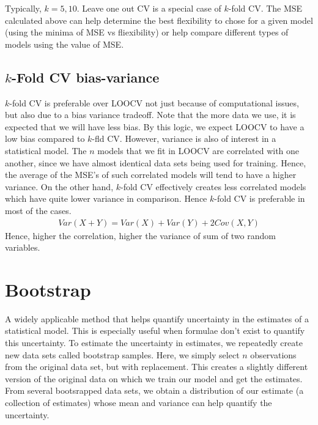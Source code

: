 \documentclass[../statistical_learning_notes.tex]{subfiles}
\begin{document}
    Typically, $k = 5, 10$. Leave one out CV is a special case of $k$-fold CV. The MSE calculated above can help determine the best flexibility to chose for a given model (using the minima of MSE vs fliexibility) or help compare different types of models using the value of MSE. \newline

    \subsection{$k$-Fold CV bias-variance}
    $k$-fold CV is preferable over LOOCV not just because of computational issues, but also due to a bias variance tradeoff. Note that the more data we use, it is expected that we will have less bias. By this logic, we expect LOOCV to have a low bias compared to $k$-fld CV. However, variance is also of interest in a statistical model. The $n$ models that we fit in LOOCV are correlated with one another, since we have almost identical data sets being used for training. Hence, the average of the MSE's of such correlated models will tend to have a higher variance. On the other hand, $k$-fold CV effectively creates less correlated models which have quite lower variance in comparison. Hence $k$-fold CV is preferable in most of the cases.
    \begin{align*}
        Var(X + Y) = Var(X) + Var(Y) + 2Cov(X,Y)
    \end{align*}
    Hence, higher the correlation, higher the variance of sum of two random variables.
    

    \section{Bootstrap}
    A widely applicable method that helps quantify uncertainty in the estimates of a statistical model. This is especially useful when formulae don't exist to quantify this uncertainty.\newline
    To estimate the uncertainty in estimates, we repeatedly create new data sets called bootstrap samples. Here, we simply select $n$ observations from the original data set, but with replacement. This creates a slightly different version of the original data on which we train our model and get the estimates. From several bootsrapped data sets, we obtain a distribution of our estimate (a collection of estimates) whose mean and variance can help quantify the uncertainty.\newline
\end{document}
